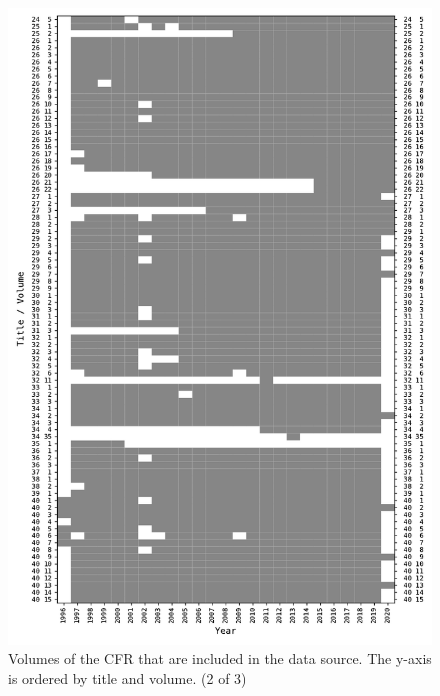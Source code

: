 \documentclass[utf8,sort&compress,numbers,square,table,hidelinks]{frontiers_suppmat} %
\begin{document}
\begin{figure}
	\centering
	\includegraphics[height=0.9\textheight]{figure_si_cfr_inputs-1}
	\caption{Volumes of the CFR that are included in the data source. The y-axis is ordered by title and volume. (2 of 3)}\label{fig:missing-cfr-volumes-2}
\end{figure}
\end{document}
